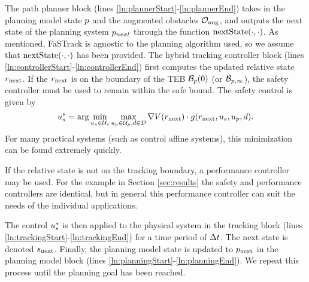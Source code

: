 The path planner block (lines \ref{ln:plannerStart}-\ref{ln:plannerEnd}) takes in the planning model state $p$ and the augmented obstacles $\mathcal{O}_\text{aug}$, and outputs the next state of the planning system $p_{next}$ through the function $\text{nextState}(\cdot, \cdot)$.
As mentioned, FaSTrack is agnostic to the planning algorithm used, so we assume that $\text{nextState}(\cdot, \cdot)$ has been provided.
The hybrid tracking controller block (lines \ref{ln:controllerStart}-\ref{ln:controllerEnd}) first computes the updated relative state $r_\text{next}$. 
If the $r_\text{next}$ is on the boundary of the TEB $\mathcal B_p(0)$ (or $\mathcal B_{p, \infty}$), the safety controller must be used to remain within the safe bound. 
The safety control is given by
\begin{equation}
  \label{eq:opt_ctrl}
	\tctrl^* = \arg\min_{\tctrl\in\tcset} \max_{\pctrl\in\pcset, \dstb\in\dset} \nabla\valfunc(\rstate_\text{next}) \cdot \rdyn(\rstate_\text{next},\tctrl,\pctrl,\dstb).
\end{equation}
For many practical systems (such as control affine systems), this minimization can be found extremely quickly.

If the relative state is not on the tracking boundary, a performance controller may be used. For the example in Section \ref{sec:results} the safety and performance controllers are identical, but in general this performance controller can suit the needs of the individual applications.

The control $u_s^*$ is then applied to the physical system in the tracking block (lines \ref{ln:trackingStart}-\ref{ln:trackingEnd}) for a time period of $\Delta t$. 
The next state is denoted $s_\text{next}$. 
Finally, the planning model state is updated to $p_\text{next}$ in the planning model block (lines \ref{ln:planningStart}-\ref{ln:planningEnd}). 
We repeat this process until the planning goal has been reached.
